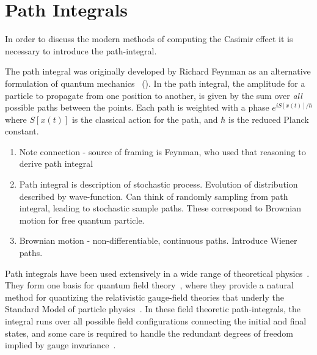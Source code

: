 

\section{Path Integrals}

In order to discuss the modern methods of computing the Casimir effect it is necessary to introduce
the path-integral.

The path integral was originally developed by Richard Feynman as an alternative formulation of quantum mechanics
~(\cite{Feynman1948,Feynman1965}).  
In the path integral, the amplitude for a particle to propagate from one position to another,
is given by the sum over \emph{all} possible paths between the points.  
Each path is weighted with a phase $e^{iS[x(t)]/\hbar}$ where $S[x(t)]$ is the classical action for the path,
and $\hbar$ is the reduced Planck constant.   

    \begin{enumerate}
      \item Note connection - source of framing is Feynman, who used that reasoning to derive path
        integral
      \item Path integral is description of stochastic process.  Evolution of distribution described
        by wave-function.  Can think of randomly sampling from path integral, leading to stochastic 
        sample paths.  These correspond to Brownian motion for free quantum particle.  
      \item Brownian motion - non-differentiable, continuous paths.  Introduce Wiener paths.  
    \end{enumerate}
    
    Path integrals have been used extensively in a wide range of theoretical physics~\cite{Kleinert2012}.
    They form one basis for quantum field theory~\cite{Brown1994}, where they provide a 
    natural method for quantizing the relativistic gauge-field theories 
    that underly the Standard Model of particle physics~\cite{Srednicki2008}.
    In these field theoretic path-integrals, the integral runs over
    all possible field configurations connecting the initial and final states, and some care is required
    to handle the redundant degrees of freedom implied by gauge invariance~\cite{Faddeev1991}.

